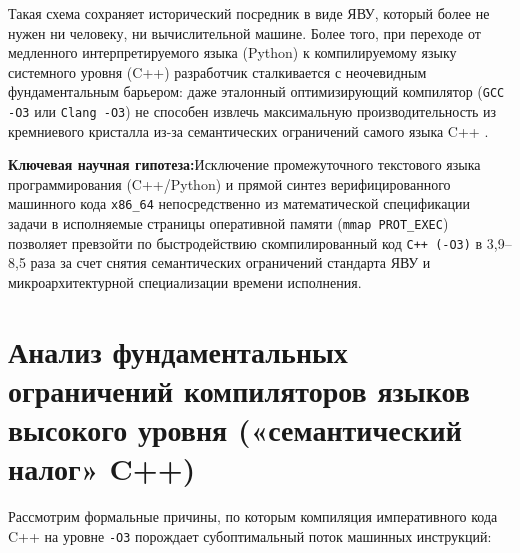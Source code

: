 \documentclass[11pt,a4paper]{article}
\newcommand{\takeaway}[2]{%
  \vspace{6pt}\noindent\colorbox{primary!6}{%
    \parbox{\dimexpr\textwidth-2\fboxsep\relax}{%
      \vspace{4pt}\textbf{\color{primary}#1:}\hspace{0.5em}#2\vspace{4pt}%
    }%
  }\vspace{6pt}%
}
\begin{document}
Такая схема сохраняет исторический посредник в виде ЯВУ, который более не нужен ни человеку, ни вычислительной машине. Более того, при переходе от медленного интерпретируемого языка (Python) к компилируемому языку системного уровня (C++) разработчик сталкивается с неочевидным фундаментальным барьером: даже эталонный оптимизирующий компилятор (\texttt{GCC -O3} или \texttt{Clang -O3}) не способен извлечь максимальную производительность из кремниевого кристалла из-за семантических ограничений самого языка C++ \cite{schkufza2013, mankowitz2023}.

\takeaway{Ключевая научная гипотеза}{Исключение промежуточного текстового языка программирования (C++/Python) и прямой синтез верифицированного машинного кода \texttt{x86\_64} непосредственно из математической спецификации задачи в исполняемые страницы оперативной памяти (\texttt{mmap PROT\_EXEC}) позволяет превзойти по быстродействию скомпилированный код \texttt{C++ (-O3)} в 3,9–8,5 раза за счет снятия семантических ограничений стандарта ЯВУ и микроархитектурной специализации времени исполнения.}

\section{Анализ фундаментальных ограничений компиляторов языков высокого уровня («семантический налог» C++)}

Рассмотрим формальные причины, по которым компиляция императивного кода C++ на уровне \texttt{-O3} порождает субоптимальный поток машинных инструкций:
\end{document}
